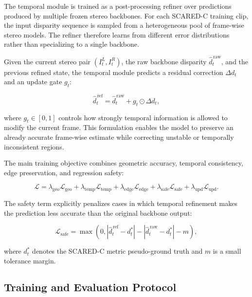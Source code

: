 \documentclass[11pt,a4paper]{article}
\begin{document}
The temporal module is trained as a post-processing refiner over predictions produced by
multiple frozen stereo backbones. For each SCARED-C training clip, the input disparity
sequence is sampled from a heterogeneous pool of frame-wise stereo models. The refiner
therefore learns from different error distributions rather than specializing to a single
backbone.

Given the current stereo pair $(I_t^L, I_t^R)$, the raw backbone disparity
$\hat{d}_t^{\,\mathrm{raw}}$, and the previous refined state, the temporal module predicts a
residual correction $\Delta d_t$ and an update gate $g_t$:

\begin{equation}
    \hat{d}_t^{\,\mathrm{ref}}
    =
    \hat{d}_t^{\,\mathrm{raw}}
    +
    g_t \odot \Delta d_t,
\end{equation}

where $g_t \in [0,1]$ controls how strongly temporal information is allowed to modify the
current frame. This formulation enables the model to preserve an already accurate
frame-wise estimate while correcting unstable or temporally inconsistent regions.

The main training objective combines geometric accuracy, temporal consistency, edge
preservation, and regression safety:

\begin{equation}
    \mathcal{L}
    =
    \lambda_{\mathrm{geo}} \mathcal{L}_{\mathrm{geo}}
    +
    \lambda_{\mathrm{temp}} \mathcal{L}_{\mathrm{temp}}
    +
    \lambda_{\mathrm{edge}} \mathcal{L}_{\mathrm{edge}}
    +
    \lambda_{\mathrm{safe}} \mathcal{L}_{\mathrm{safe}}
    +
    \lambda_{\mathrm{upd}} \mathcal{L}_{\mathrm{upd}}.
\end{equation}

The safety term explicitly penalizes cases in which temporal refinement makes the prediction
less accurate than the original backbone output:

\begin{equation}
    \mathcal{L}_{\mathrm{safe}}
    =
    \max
    \left(
        0,
        \left|
        \hat{d}_t^{\,\mathrm{ref}} - d_t^{*}
        \right|
        -
        \left|
        \hat{d}_t^{\,\mathrm{raw}} - d_t^{*}
        \right|
        -
        m
    \right),
\end{equation}

where $d_t^{*}$ denotes the SCARED-C metric pseudo-ground truth and $m$ is a small tolerance
margin.

\subsection{Training and Evaluation Protocol}
\end{document}
